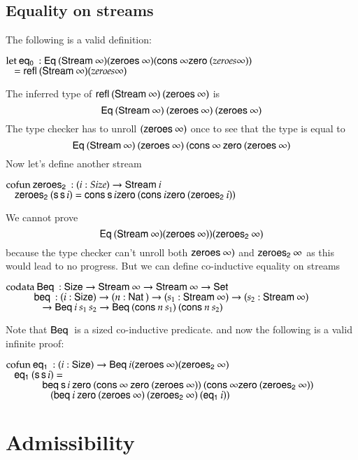 \subsection{Equality on streams}
The following is a valid definition:
\begin{bsp}
$\mathrm{let}\: \mathsf{eq_0}\: : \mathsf{Eq}\: (\mathsf{Stream}\: \infty) (\mathsf{zeroes}\: \infty) (\mathsf{cons}\: \infty \mathsf{zero}\: (zeroes \infty))$\\
$\hspace*{3mm} = \mathsf{refl}\: (\mathsf{Stream}\: \infty) (zeroes \infty)$
\end{bsp}
The inferred type of $\mathsf{refl}\: (\mathsf{Stream}\: \infty) \: (\mathsf{zeroes}\: \infty)$ is 
\[\mathsf{Eq}\: (\mathsf{Stream}\: \infty) \: (\mathsf{zeroes}\: \infty) \: (\mathsf{zeroes}\: \infty)\]
The type checker has to unroll $(\mathsf{zeroes}\: \infty)$ once to see that the type is equal to 
\[
\mathsf{Eq}\: (\mathsf{Stream}\: \infty) \: (\mathsf{zeroes}\: \infty) \: (\mathsf{cons}\: \infty \: \mathsf{zero}\: (\mathsf{zeroes}\: \infty)
\]
Now let's define another stream
\begin{bsp}
$\mathrm{cofun}\: \mathsf{zeroes_2}\:: ( i : Size ) \rightarrow{\mathsf{Stream}\:i} $ \\
$\hspace*{3mm} \mathsf{zeroes_2}\: (\mathsf{s}\, \mathsf{s}\, i) = \mathsf{cons}\: \mathsf{s}\, i \mathsf{zero}\: (\mathsf{cons}\: i \mathsf{zero}\: (\mathsf{zeroes_2}\: i))$\\
\end{bsp}
We cannot prove \[\mathsf{Eq}\: (\mathsf{Stream}\: \infty) (\mathsf{zeroes}\: \infty)) (\mathsf{zeroes_2}\: \infty)\]
because the type checker can't unroll both $\mathsf{zeroes}\: \infty)$ and $\mathsf{zeroes_2}\: \infty$ as
this would lead to no progress.
But we can define co-inductive equality  on streams \cite{coquand-infinite}
\begin{bsp}
$\mathrm{codata}\: \mathsf{Beq}\: : \mathsf{Size} \rightarrow \mathsf{Stream}\: \infty \rightarrow \mathsf{Stream}\: \infty \rightarrow \mathsf{Set}$\\
$ \spcx \beq : (i : \Size ) \ra ( n : \Nat ) \ra (s_1 : \Stream \infty ) \ra (s_2 : \Stream \infty )$\\
$ \spcx \spc  \ra \beqd i \: s_1 \: s_2 \ra \beqd (\cons n \: s_1) \: (\cons n \: s_2)$
\end{bsp}
Note that $\mathsf{Beq}\:$ is a sized co-inductive predicate.
and now the following is a valid infinite proof:
\begin{bsp}
$\mathrm{cofun}\: \mathsf{eq_1}\: : (i : \mathsf{Size} ) \rightarrow \mathsf{Beq}\: i (\mathsf{zeroes}\: \infty) (\mathsf{zeroes_2}\: \infty)$\\
$\hspace*{3mm} \mathsf{eq_1}\: (\mathsf{s}\, \mathsf{s}\, i) = $\\
$\spc \spcx \beq \s i \: \zero (\cons \infty \: \zero (\zeroes \infty)) \: (\cons \infty \zero (\zeroest \infty))$\\ 
$\spc \spcx \spc (\beq i \: \zero (\zeroes \infty) \: (\zeroest \infty) \: (\eqt i))$
\end{bsp}

\section{Admissibility}


